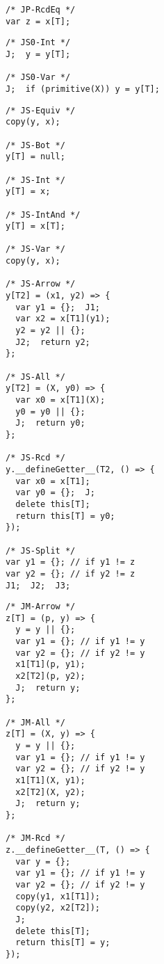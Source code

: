 \documentclass{article}
\begin{document}
\vfill
\ottdefndproj

\begin{verbatim}
/* JP-RcdEq */
var z = x[T];
\end{verbatim}

\newpage
\ottdefncsubZero

\begin{multicols}{2}
\begin{verbatim}
/* JS0-Int */
J;  y = y[T];

/* JS0-Var */
J;  if (primitive(X)) y = y[T];
\end{verbatim}
\end{multicols}

\ottdefncsub

\begin{multicols}{3}
\begin{verbatim}
/* JS-Equiv */
copy(y, x);

/* JS-Bot */
y[T] = null;

/* JS-Int */
y[T] = x;

/* JS-IntAnd */
y[T] = x[T];

/* JS-Var */
copy(y, x);

/* JS-Arrow */
y[T2] = (x1, y2) => {
  var y1 = {};  J1;
  var x2 = x[T1](y1);
  y2 = y2 || {};
  J2;  return y2;
};

/* JS-All */
y[T2] = (X, y0) => {
  var x0 = x[T1](X);
  y0 = y0 || {};
  J;  return y0;
};

/* JS-Rcd */
y.__defineGetter__(T2, () => {
  var x0 = x[T1];
  var y0 = {};  J;
  delete this[T];
  return this[T] = y0;
});

/* JS-Split */
var y1 = {}; // if y1 != z
var y2 = {}; // if y2 != z
J1;  J2;  J3;
\end{verbatim}
\end{multicols}

\newpage
\ottdefncmerge

\begin{multicols}{3}
\begin{verbatim}
/* JM-Arrow */
z[T] = (p, y) => {
  y = y || {};
  var y1 = {}; // if y1 != y
  var y2 = {}; // if y2 != y
  x1[T1](p, y1);
  x2[T2](p, y2);
  J;  return y;
};

/* JM-All */
z[T] = (X, y) => {
  y = y || {};
  var y1 = {}; // if y1 != y
  var y2 = {}; // if y2 != y
  x1[T1](X, y1);
  x2[T2](X, y2);
  J;  return y;
};

/* JM-Rcd */
z.__defineGetter__(T, () => {
  var y = {};
  var y1 = {}; // if y1 != y
  var y2 = {}; // if y2 != y
  copy(y1, x1[T1]);
  copy(y2, x2[T2]);
  J;
  delete this[T];
  return this[T] = y;
});
\end{verbatim}
\end{multicols}
\end{document}
